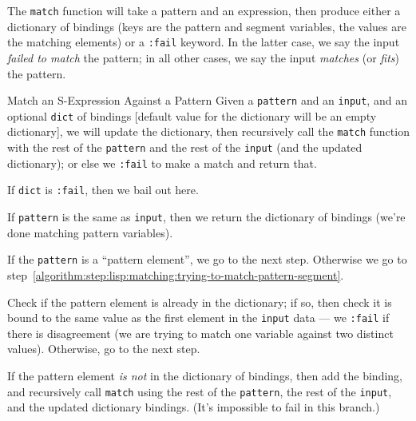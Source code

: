 The \lstinline[language=lisp]{match} function will take a pattern and an
expression, then produce either a dictionary of bindings (keys are the
pattern and segment variables, the values are the matching elements) or
a \lstinline[language=lisp]{:fail} keyword. In the latter case, we say
the input \emph{failed to match} the pattern; in all other cases, we say
the input \emph{matches} (or \emph{fits}) the pattern.

\begin{algorithm}{Match an S-Expression Against a Pattern}
Given a \lstinline[language=lisp]{pattern} and an
\lstinline[language=lisp]{input}, and an optional
\lstinline[language=lisp]{dict} of bindings [default value for the
  dictionary will be an empty dictionary], we will update the
dictionary, then recursively call the
\lstinline[language=lisp]{match} function with
the rest of the \lstinline[language=lisp]{pattern} and the rest of the
\lstinline[language=lisp]{input} (and the updated dictionary); or else
we \lstinline[language=lisp]{:fail} to make a match and return that.\setcounter{algorithmstep}{-1}

 If \lstinline[language=lisp]{dict} is
\lstinline[language=lisp]{:fail}, then we bail out here.

 If
\lstinline[language=lisp]{pattern} is the same as
\lstinline[language=lisp]{input}, then we return the dictionary of
bindings (we're done matching pattern variables).

 If the \lstinline[language=lisp]{pattern} is a ``pattern
element'', we go to the next step. Otherwise we go to step~\ref{algorithm:step:lisp:matching:trying-to-match-pattern-segment}.

Check if the pattern element is already in the dictionary; if so, then
check it is bound to the same value as the first element in the
\lstinline[language=lisp]{input} data --- we
\lstinline[language=lisp]{:fail} if there is disagreement (we are trying
to match one variable against two distinct values). Otherwise, go to the
next step.

If the pattern element \emph{is not} in the dictionary of bindings, then
add the binding, and recursively call \lstinline[language=lisp]{match}
using the rest of the \lstinline[language=lisp]{pattern},
the rest of the \lstinline[language=lisp]{input}, and the updated
dictionary bindings. (It's impossible to fail in this branch.)


\end{algorithm}
